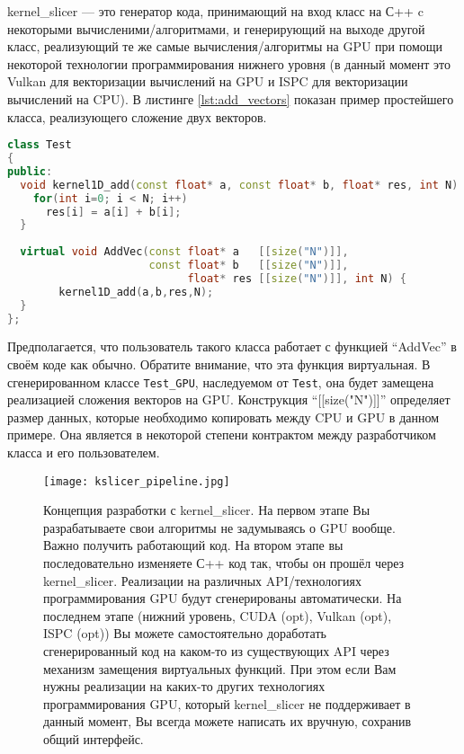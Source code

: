\documentclass[11pt,fleqn,english,russian]{report} %
\begin{document}
kernel\_slicer --- это генератор кода, принимающий на вход класс на С++ c некоторыми вычисленими/алгоритмами, и генерирующий на выходе другой класс, реализующий те же самые вычисления/алгоритмы на GPU при помощи некоторой технологии программирования нижнего уровня (в данный момент это Vulkan для векторизации вычислений на GPU и ISPC \cite{ispc} для векторизации вычислений на CPU). В листинге \ref{lst:add_vectors} показан пример простейшего класса, реализующего сложение двух векторов.

\begin{lstlisting}[language=C++, caption=сложение двух векторов]
class Test 
{
public:	
  void kernel1D_add(const float* a, const float* b, float* res, int N) {
    for(int i=0; i < N; i++)
      res[i] = a[i] + b[i];
  } 
	
  virtual void AddVec(const float* a   [[size("N")]], 
                      const float* b   [[size("N")]], 
                            float* res [[size("N")]], int N) {
		kernel1D_add(a,b,res,N); 
  } 	
};
\end{lstlisting}\label{lst:add_vectors}

Предполагается, что пользователь такого класса работает с функцией ``AddVec'' в своём коде как обычно. Обратите внимание, что эта функция виртуальная. В сгенерированном классе \texttt{Test\_GPU}, наследуемом от \texttt{Test}, она будет замещена реализацией сложения векторов на GPU. Конструкция ``[[size("N")]]'' определяет размер данных, которые необходимо копировать между CPU и GPU в данном примере. Она является в некоторой степени контрактом между разработчиком класса и его пользователем.


\begin{figure}[h!]
	\centering
	\texttt{[image: kslicer\_pipeline.jpg]}
	\caption{Концепция разработки с kernel\_slicer. На первом этапе Вы разрабатываете свои алгоритмы не задумываясь о GPU вообще. Важно получить работающий код. На втором этапе вы последовательно изменяете С++ код так, чтобы он прошёл через kernel\_slicer. Реализации на различных API/технологиях программирования GPU будут сгенерированы автоматически. На последнем этапе (нижний уровень, CUDA (opt), Vulkan (opt), ISPC (opt)) Вы можете самостоятельно доработать сгенерированный код на каком-то из существующих API через механизм замещения виртуальных функций. При этом если Вам нужны реализации на каких-то других технологиях программирования GPU, который kernel\_slicer не поддерживает в данный момент, Вы всегда можете написать их вручную, сохранив общий интерфейс. }
\end{figure}
\end{document}
